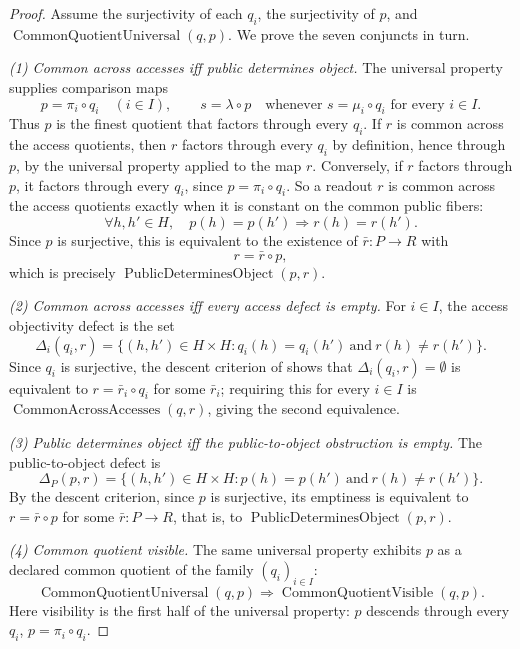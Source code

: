 \begin{proof}
Assume the surjectivity of each \(q_i\), the surjectivity of \(p\),
and \(\operatorname{CommonQuotientUniversal}(q,p)\).  We prove the
seven conjuncts in turn.

\emph{(1) Common across accesses iff public determines object.}
The universal property supplies comparison maps
\[
  p=\pi_i\circ q_i\quad(i\in I),
  \qquad
  s=\lambda\circ p
  \quad\text{whenever } s=\mu_i\circ q_i \text{ for every } i\in I .
\]
Thus \(p\) is the finest quotient that factors through every \(q_i\).
If \(r\) is common across the access quotients, then \(r\) factors through
every \(q_i\) by definition, hence through
\(p\), by the universal property applied to the map \(r\).  Conversely, if \(r\) factors through \(p\), it factors through
every \(q_i\), since \(p=\pi_i\circ q_i\).  So a readout \(r\) is common
across the access quotients exactly when it is constant on the common
public fibers:
\[
  \forall h,h'\in H,\quad
  p(h)=p(h')\Longrightarrow r(h)=r(h').
\]
Since \(p\) is surjective, this is equivalent to the existence of
\(\bar r:P\to R\) with
\[
  r=\bar r\circ p,
\]
which is precisely \(\operatorname{PublicDeterminesObject}(p,r)\).

\emph{(2) Common across accesses iff every access defect is empty.}
For \(i\in I\), the access objectivity defect is the set
\[
  \Delta_i(q_i,r)
  =
  \{(h,h')\in H\times H:
      q_i(h)=q_i(h')\ \text{and}\ r(h)\neq r(h')\}.
\]
Since \(q_i\) is surjective, the descent criterion of
 shows that \(\Delta_i(q_i,r)=\emptyset\) is
equivalent to \(r=\bar r_i\circ q_i\) for some \(\bar r_i\); requiring
this for every \(i\in I\) is \(\operatorname{CommonAcrossAccesses}(q,r)\),
giving the second equivalence.

\emph{(3) Public determines object iff the public-to-object
obstruction is empty.}
The public-to-object defect is
\[
  \Delta_P(p,r)
  =
  \{(h,h')\in H\times H:
      p(h)=p(h')\ \text{and}\ r(h)\neq r(h')\}.
\]
By the descent criterion, since \(p\) is surjective, its emptiness is
equivalent to \(r=\bar r\circ p\) for some \(\bar r:P\to R\), that is, to
\(\operatorname{PublicDeterminesObject}(p,r)\).

\emph{(4) Common quotient visible.}
The same universal property exhibits \(p\) as a declared common
quotient of the family \((q_i)_{i\in I}\):
\[
  \operatorname{CommonQuotientUniversal}(q,p)
  \Longrightarrow
  \operatorname{CommonQuotientVisible}(q,p).
\]
Here visibility is the first half of the universal property: \(p\)
descends through every \(q_i\), \(p=\pi_i\circ q_i\).


\end{proof}
